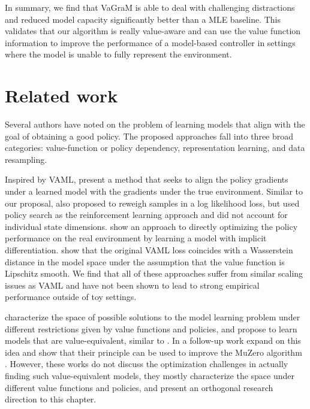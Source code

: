 In summary, we find that VaGraM is able to deal with challenging distractions and reduced model capacity significantly better than a MLE baseline. This validates that our algorithm is really value-aware and can use the value function information {to improve the performance of a model-based controller in settings where the model is unable to fully represent the environment.}

\section{Related work}

Several authors have noted on the problem of learning models that align with the goal of obtaining a good policy. The proposed approaches fall into three broad categories: value-function or policy dependency, representation learning, and data resampling.

Inspired by VAML, \textcite{abachi2020policy} present a method that seeks to align the policy gradients under a learned model with the gradients under the true environment. Similar to our proposal, \textcite{doro2020gradient} also proposed to reweigh samples in a log likelihood loss, but used policy search as the reinforcement learning approach and did not account for individual state dimensions. \textcite{nikishin2021control} show an approach to directly optimizing the policy performance on the real environment by learning a model with implicit differentiation. \textcite{asadi2018equivalence} show that the original VAML loss coincides with a Wasserstein distance in the model space under the assumption that the value function is Lipschitz smooth. We find that all of these approaches suffer from similar scaling issues as VAML and have not been shown to lead to strong empirical performance outside of toy settings.

\textcite{grimm2020value} characterize the space of possible solutions to the model learning problem under different restrictions given by value functions and policies, and propose to learn models that are value-equivalent, similar to \textcite{vaml}. In a follow-up work \textcite{grimm2021proper} expand on this idea and show that their principle can be used to improve the MuZero algorithm \parencite{schrittwieser2020mastering}. However, these works do not discuss the optimization challenges in actually finding such value-equivalent models, they mostly characterize the space under different value functions and policies, and present an orthogonal research direction to this chapter.


